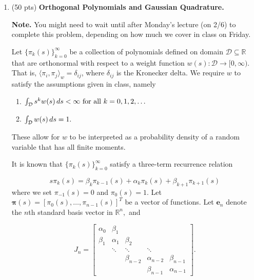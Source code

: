 \documentclass[11pt,letterpaper,twoside]{article}
\newcommand{\R}{\mathbb{R}}
\begin{document}
\begin{enumerate}
\bigskip

\item (50 pts) \textbf{Orthogonal Polynomials and Gaussian Quadrature.}

\textbf{Note.} You might need to wait until after Monday's lecture (on 2/6) to complete this problem, depending on how much we cover in class on Friday.
\medskip

Let $\{ \pi_k(s) \}_{k = 0}^\infty$ be a collection of polynomials defined on domain $\mathcal{D} \subseteq \R$ that are orthonormal with respect to a weight function $w(s):\mathcal{D} \rightarrow [0, \infty)$. That is, $\langle \pi_i, \pi_j \rangle_w = \delta_{i j}$, where $\delta_{ij}$ is the Kronecker delta. We require $w$ to satisfy the assumptions given in class, namely
\begin{enumerate}
\item $\int_{\mathcal{D}}  s^k w(s) \thinspace ds < \infty \text{ for all } k = 0,1,2,\ldots$
\item $\int_{\mathcal{D}} w(s) \thinspace ds  = 1.$
\end{enumerate}

These allow for $w$ to be interpreted as a probability density of a random variable that has all finite moments. 

\medskip

It is known that $\{\pi_k(s)\}_{k = 0}^\infty$ satisfy a three-term recurrence relation

\begin{equation}
s \pi_k(s) = \beta_k \pi_{k -1}(s) + \alpha_k \pi_k(s) + \beta_{k + 1} \pi_{k + 1} (s) \label{3-term}
\end{equation}
where we set $\pi_{-1}(s) = 0$ and $\pi_0(s) = 1.$ Let $\bm{\pi}(s) = [\pi_0(s), \ldots, \pi_{n-1}(s)]^T$ be a vector of functions. Let $\bm{e}_n$ denote the $n$th standard basis vector in $\R^n,$ and

\[ J_n = \begin{bmatrix}  \alpha_0 & \beta_1 &  		         &                     & \\
		                       \beta_1 & \alpha_1 & \beta_2       &                     & \\ 
		                                    & \ddots     & \ddots         & \ddots           & \\
		                                    &                & \beta_{n-2} & \alpha_{n-2} & \beta_{n-1} \\
		                                    &		    &			 & \beta_{n-1}   & \alpha_{n-1} \end{bmatrix}. \] 


\end{enumerate}
\end{document}
